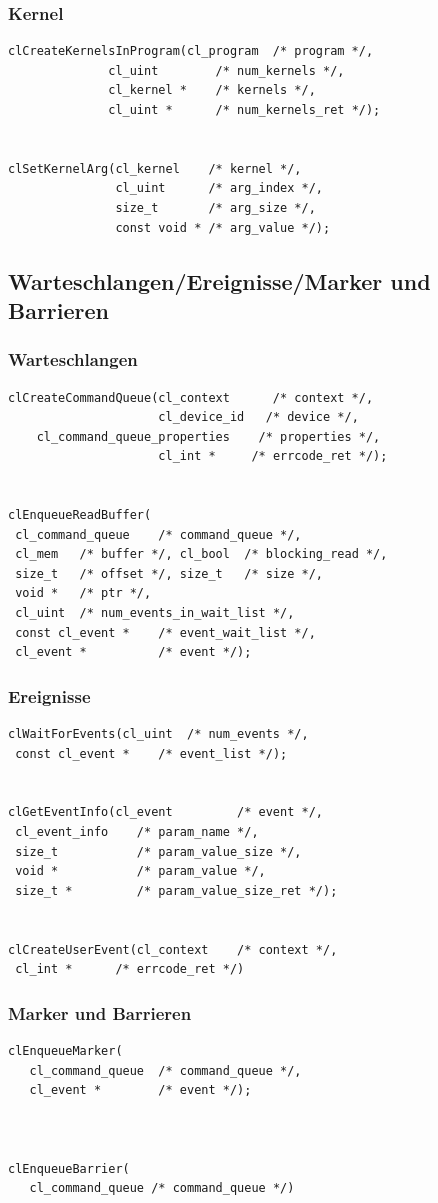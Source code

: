 \documentclass{beamer}
\begin{document}
\begin{frame}[fragile]
\frametitle{Kernel}
\begin{lstlisting}
clCreateKernelsInProgram(cl_program  /* program */,
              cl_uint        /* num_kernels */,
              cl_kernel *    /* kernels */,
              cl_uint *      /* num_kernels_ret */);


clSetKernelArg(cl_kernel    /* kernel */,
               cl_uint      /* arg_index */,
               size_t       /* arg_size */,
               const void * /* arg_value */);
\end{lstlisting}
\end{frame}

\subsection{Warteschlangen/Ereignisse/Marker und Barrieren}
\begin{frame}[fragile]
\frametitle{Warteschlangen}
\begin{lstlisting}
clCreateCommandQueue(cl_context      /* context */, 
                     cl_device_id   /* device */, 
    cl_command_queue_properties    /* properties */,
                     cl_int *     /* errcode_ret */);


clEnqueueReadBuffer(
 cl_command_queue    /* command_queue */,
 cl_mem   /* buffer */, cl_bool  /* blocking_read */,
 size_t   /* offset */, size_t   /* size */, 
 void *   /* ptr */,
 cl_uint  /* num_events_in_wait_list */,
 const cl_event *    /* event_wait_list */,
 cl_event *          /* event */);
\end{lstlisting}
\end{frame}

\begin{frame}[fragile]
\frametitle{Ereignisse}
\begin{lstlisting}
clWaitForEvents(cl_uint  /* num_events */,
 const cl_event *    /* event_list */);


clGetEventInfo(cl_event         /* event */,
 cl_event_info    /* param_name */,
 size_t           /* param_value_size */,
 void *           /* param_value */,
 size_t *         /* param_value_size_ret */);


clCreateUserEvent(cl_context    /* context */,
 cl_int *      /* errcode_ret */)
\end{lstlisting}
\end{frame}

\begin{frame}[fragile]
\frametitle{Marker und Barrieren}
\begin{lstlisting}
clEnqueueMarker(
   cl_command_queue  /* command_queue */,
   cl_event *        /* event */);



clEnqueueBarrier(
   cl_command_queue /* command_queue */)
\end{lstlisting}
\end{frame}
\end{document}
